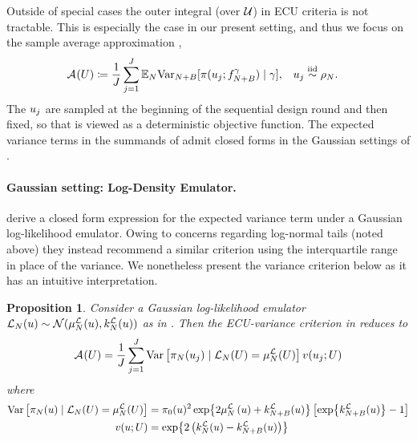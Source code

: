 \documentclass[12pt]{article}
\newtheorem{prop}{Proposition}
\begin{document}
Outside of special cases \citep{Binois_2018,MakTargetedVar,Koermer2024} the outer integral (over $\parSpace$) 
in ECU criteria is not tractable. This is especially the case in our present setting,
and thus we focus on the sample average approximation \citep{Mercer_kernels_IVAR,botorch},
\begin{align}
&\acq[](\parMat) \Def \frac{1}{J}
\sum_{j=1}^{J} \E_{\Ndesign} \Var_{\Naugment}[\postDens(\Par_j; \funcEm[\Naugment]^{\gamma}) \given \gamma],
&&\Par_j \overset{\mathrm{iid}}{\sim} \weightDens[\Ndesign].
 \label{eq:acq-intvar-saa}
\end{align}
The $\Par_j$ are sampled at the beginning of the sequential design round and then fixed, so that
 is viewed as a deterministic objective function. 
The expected variance 
terms in the summands of  admit closed forms in the Gaussian 
settings of .

\paragraph{Gaussian setting: Log-Density Emulator.} 

\citet{VehtariParallelGP} derive a closed form expression for the expected variance term under a Gaussian
log-likelihood emulator. Owing to concerns regarding log-normal tails (noted above) they instead recommend
a similar criterion using the interquartile range in place of the variance. We nonetheless present the variance 
criterion below as it has an intuitive interpretation.

\begin{prop} \label{prop:acq-intvar-ldens-Gaussian}
Consider a Gaussian log-likelihood emulator 
$\llikEm[\Ndesign](\Par) \sim \Gaussian(\emMean[\Ndesign]{\llik}(\Par), \emKer[\Ndesign]{\llik}(\Par))$
as in . Then the ECU-variance criterion in  reduces to
\begin{equation}
\acq[](\parMat) = \frac{1}{J}
\sum_{j=1}^{J} \Var\left[\postEm(\Par_j) \given \llikEm(\parMat) = \emMean[\Ndesign]{\llik}(\parMat) \right] \varInflation(\Par_j; \parMat)   
\label{eq:acq-intvar-saa-ldens}
\end{equation}
where
\begin{align*}
\Var\left[\postEm(\Par) \given \llikEm(\parMat) = \emMean[\Ndesign]{\llik}(\parMat) \right]
&= \priorDens(\Par)^2 \Exp{2\emMean[\Ndesign]{\llik}\left(\Par\right) + \emKer[\Naugment]{\llik}(\Par)} 
\left[\Exp{\emKer[\Naugment]{\llik}(\Par)} - 1 \right] \\
\varInflation(\Par; \parMat)
&= \Exp{2\left(\emKer[\Ndesign]{\llik}(\Par) - \emKer[\Naugment]{\llik}(\Par)\right)}
\end{align*}
\end{prop}
\end{document}
